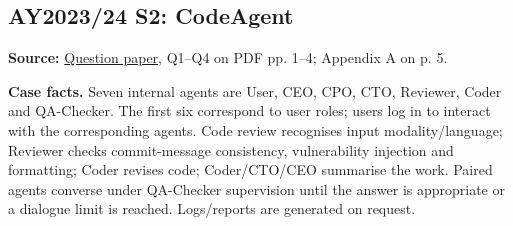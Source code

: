 \begin{studycolumns}
\subsection*{AY2023/24 S2: CodeAgent}\label{paper-2324-s2}
\textbf{Source:} \href{run:/Users/bryangoh/Work/ntu-cs/sc2006/pyps/SC2006\_AY2324\_S2\_Questions.pdf}{Question paper}, Q1--Q4 on PDF pp. 1--4; Appendix A on p. 5.

\textbf{Case facts.} Seven internal agents are User, CEO, CPO, CTO, Reviewer, Coder and QA-Checker. The first six correspond to user roles; users log in to interact with the corresponding agents. Code review recognises input modality/\allowbreak{}language; Reviewer checks commit-message consistency, vulnerability injection and formatting; Coder revises code; Coder/\allowbreak{}CTO/\allowbreak{}CEO summarise the work. Paired agents converse under QA-Checker supervision until the answer is appropriate or a dialogue limit is reached. Logs/\allowbreak{}reports are generated on request.
\end{studycolumns}
